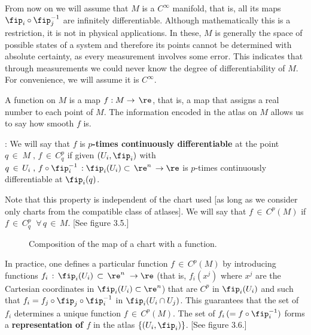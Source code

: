 From now on we will assume that $M$ is a $C^\infty$ manifold, that is, all its maps $\fip_i\circ\fip_j^{-1}$ are infinitely differentiable. Although mathematically this is a restriction, it is not in physical applications. In these, $M$ is generally the space of possible states of a system and therefore its points cannot be determined with absolute certainty, as every measurement involves some error.
This indicates that through measurements we could never know the degree of differentiability of $M$. For convenience, we will assume it is $C^\infty$.

A function on $M$ is a map $f:M\to\,\re$, that is, a map that assigns a real number to each point of $M$. The information encoded in the atlas on $M$ allows us to say how smooth $f$ is.

: We will say that $f$ is {\bf $p$-times continuously differentiable} at the point $q\,\in\;M\;,\,f\,\in\,C_q^p $ if given $(U_i,\fip_i)$ with $q\,\in\,U_i\;,\,f\circ\fip_i^{-1}\,:\fip_i(U_i)\subset \,\re^n\,\to\re$ is $p$-times continuously differentiable at $\fip_i(q)$.

\noi Note that this property is independent of the chart used [as long as we consider only charts from the compatible class of atlases].
We will say that $f\,\in\,C^p(M)$ if $f\,\in\,C_q^p\;\;\forall\,q\,\in\,M$.
[See figure 3.5.]

\espa 

\begin{figure}[htbp]
  \begin{center}
    \caption{Composition of the map of a chart with a function.}
    \label{fig:3_5}
  \end{center}
\end{figure}

In practice, one defines a particular function $f\,\in\,C^p(M)$ by introducing functions $f_i\,:\,\fip_i(U_i)\,\subset\,\re^n\;\to\re$ (that is, $f_i(x^j)$ where $x^j$ are the Cartesian coordinates in $\fip_i(U_i)\subset\re^n $) that are $C^p$ in $\fip_i(U_i)$ and such that $f_i=f_j\circ\fip_j\circ\fip_i^{-1}$ in $\fip_i(U_i\cap U_j)$.
This guarantees that the set of $f_i$ determines a unique function $f\,\in\,C^p(M)$. The set of $f_i\,(=f\circ \fip_i^{-1})$ forms a {\bf representation of $f$} in the atlas $\{(U_i,\fip_i)\}$.
[See figure 3.6.] 

\espa 

